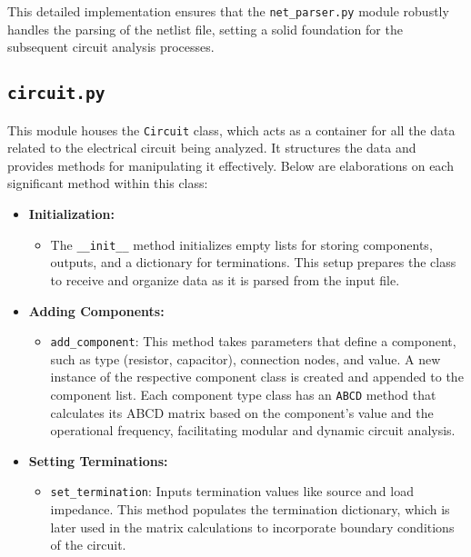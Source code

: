 \documentclass[conference]{IEEEtran}
\begin{document}
This detailed implementation ensures that the \texttt{net\_parser.py} module robustly handles the parsing of the netlist file, setting a solid foundation for the subsequent circuit analysis processes.
\newpage
\subsection{\textbf{\texttt{circuit.py}}}
This module houses the \texttt{Circuit} class, which acts as a container for all the data related to the electrical circuit being analyzed. It structures the data and provides methods for manipulating it effectively. Below are elaborations on each significant method within this class:

\begin{itemize}
\item \textbf{Initialization:}
        \begin{itemize}
        \item The \texttt{\_\_init\_\_} method initializes empty lists for storing components, outputs, and a dictionary for 
        terminations. This setup prepares the class to receive and organize data as it is parsed from the input file.
        \end{itemize}

\item \textbf{Adding Components:}
        \begin{itemize}
        \item \texttt{add\_component}: This method takes parameters that define a component, such as type (resistor, capacitor), 
        connection nodes, and value. A new instance of the respective component class is created and appended to the component 
        list. Each component type class has an \texttt{ABCD} method that calculates its ABCD matrix based on the component's 
        value and the operational frequency, facilitating modular and dynamic circuit analysis.
        \end{itemize}

\item \textbf{Setting Terminations:}
        \begin{itemize}
        \item \texttt{set\_termination}: Inputs termination values like source and load impedance. This method populates 
        the termination dictionary, which is later used in the matrix calculations to incorporate boundary conditions of
            the circuit.
        \end{itemize}


\end{itemize}
\end{document}
